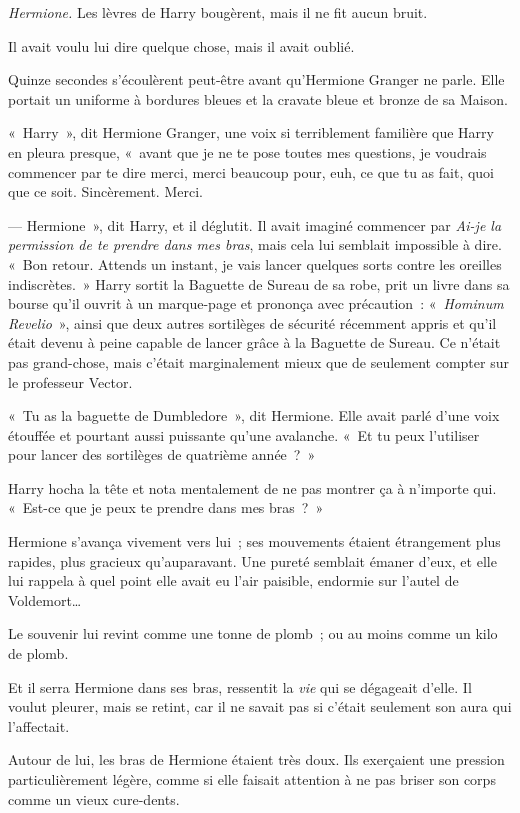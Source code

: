 \emph{Hermione.} Les lèvres de Harry bougèrent, mais il ne fit aucun bruit.

Il avait voulu lui dire quelque chose, mais il avait oublié.

Quinze secondes s'écoulèrent peut-être avant qu'Hermione Granger ne parle.
Elle portait un uniforme à bordures bleues et la cravate bleue et bronze de sa Maison.

«~Harry~», dit Hermione Granger, une voix si terriblement familière que Harry en pleura presque, «~avant que je ne te pose toutes mes questions, je voudrais commencer par te dire merci, merci beaucoup pour, euh, ce que tu as fait, quoi que ce soit.
Sincèrement.
Merci.

--- Hermione~», dit Harry, et il déglutit.
Il avait imaginé commencer par \emph{Ai-je la permission de te prendre dans mes bras}, mais cela lui semblait impossible à dire.
«~Bon retour.
Attends un instant, je vais lancer quelques sorts contre les oreilles indiscrètes.~»
Harry sortit la Baguette de Sureau de sa robe, prit un livre dans sa bourse qu'il ouvrit à un marque-page et prononça avec précaution~: «~\emph{Hominum Revelio}~», ainsi que deux autres sortilèges de sécurité récemment appris et qu'il était devenu à peine capable de lancer grâce à la Baguette de Sureau.
Ce n'était pas grand-chose, mais c'était marginalement mieux que de seulement compter sur le professeur Vector.

«~Tu as la baguette de Dumbledore~», dit Hermione.
Elle avait parlé d'une voix étouffée et pourtant aussi puissante qu'une avalanche.
«~Et tu peux l'utiliser pour lancer des sortilèges de quatrième année~?~»

Harry hocha la tête et nota mentalement de ne pas montrer ça à n'importe qui.
«~Est-ce que je peux te prendre dans mes bras~?~»

Hermione s'avança vivement vers lui~; ses mouvements étaient étrangement plus rapides, plus gracieux qu'auparavant.
Une pureté semblait émaner d'eux, et elle lui rappela à quel point elle avait eu l'air paisible, endormie sur l'autel de Voldemort…

Le souvenir lui revint comme une tonne de plomb~; ou au moins comme un kilo de plomb.

Et il serra Hermione dans ses bras, ressentit la \emph{vie} qui se dégageait d'elle.
Il voulut pleurer, mais se retint, car il ne savait pas si c'était seulement son aura qui l'affectait.

Autour de lui, les bras de Hermione étaient très doux.
Ils exerçaient une pression particulièrement légère, comme si elle faisait attention à ne pas briser son corps comme un vieux cure-dents.

